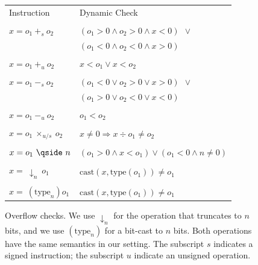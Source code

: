 \documentclass{sigplanconf}[10pt]
\begin{document}
\begin{figure}[t!]
\begin{center}
\begin{tabular}{ll}
Instruction & Dynamic Check \\ \\
$x = o_1 \ +_s \ o_2$ & $(o_1 > 0 \wedge o_2 > 0 \wedge x < 0) \ \ \vee$ \\
                      & $(o_1 < 0 \wedge o_2 < 0 \wedge x > 0)$ \\ \\
$x = o_1 \ +_u \ o_2$ & $x < o_1 \vee x < o_2$ \\ \\
$x = o_1 \ -_s \ o_2$ & $(o_1 < 0 \vee o_2 > 0 \vee x > 0) \ \ \vee$ \\
                      & $(o_1 > 0 \vee o_2 < 0 \vee x < 0)$ \\ \\
$x = o_1 \ -_u \ o_2$ & $o_1 < o_2$ \\ \\
$x = o_1 \ \times_{u/s} \ o_2$ & $x \neq 0 \Rightarrow x \div o_1 \neq o_2$ \\ \\
$x = o_1 \ \qside \ n$ & $(o_1 > 0 \wedge x < o_1) \vee (o_1 < 0 \wedge n \neq 0)$ \\ \\
$x = \ \downarrow_n \ o_1$ & $\mbox{cast}(x, \mbox{type}(o_1)) \neq o_1$ \\ \\
$x = \ (\mbox{type}_n) o_1$ & $\mbox{cast}(x, \mbox{type}(o_1)) \neq o_1$ \\
\end{tabular}
\end{center}
\caption{\label{fig:instrumentation}Overflow checks. We use $\downarrow_n$ for
the operation that truncates to $n$ bits, and we use $(\mbox{type}_n)$ for a
bit-cast to $n$ bits. Both operations have the same semantics in our setting.
The subscript $s$ indicates a signed instruction; the subscript $u$ indicate
an unsigned operation.}
\end{figure}
\end{document}
